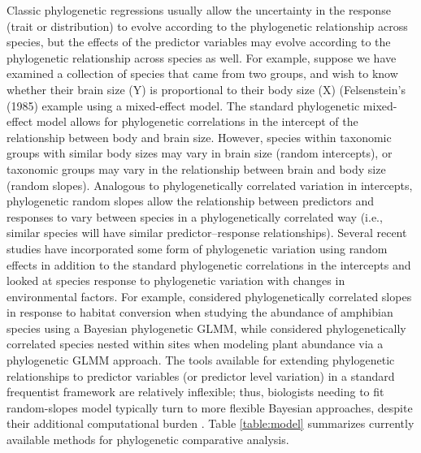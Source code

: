 \documentclass[12pt]{article}
\begin{document}
Classic phylogenetic regressions usually allow the uncertainty in the response (trait or distribution) to evolve according to the phylogenetic relationship across species, but the effects of the predictor variables may evolve according to the phylogenetic relationship across species as well. 
For example, suppose we have examined a collection of species that came from two groups, and wish to know whether their brain size (Y) is proportional to their body size (X) (Felsenstein's (1985) example using a mixed-effect model. 
The standard phylogenetic mixed-effect model allows for phylogenetic correlations in the intercept of the relationship between body and brain size. 
However, species within taxonomic groups with similar body sizes may vary in brain size (random intercepts), or taxonomic groups may vary in the relationship between brain and body size (random slopes). 
Analogous to phylogenetically correlated variation in intercepts, phylogenetic random slopes allow the relationship between predictors and responses to vary between species in a phylogenetically correlated way (i.e., similar species will have similar predictor--response relationships).
Several recent studies have incorporated some form of phylogenetic variation using random effects in addition to the standard phylogenetic correlations in the intercepts and looked at species response to phylogenetic variation with changes in environmental factors.
For example, \cite{nowakowski2018phylogenetic} considered phylogenetically correlated slopes in response to habitat conversion when studying the abundance of amphibian species using a Bayesian phylogenetic GLMM, while \cite{li2017canfun} considered phylogenetically correlated species nested within sites when modeling plant abundance via a phylogenetic GLMM approach. 
The tools available for extending phylogenetic relationships to predictor variables (or predictor level variation) in a standard frequentist framework are relatively inflexible; thus, biologists needing to fit random-slopes model typically turn to more flexible Bayesian approaches, despite their additional computational burden \citep{hadfield2010mcmc, burkner2018brms}.
Table \ref{table:model} summarizes currently available methods for phylogenetic comparative analysis.
\end{document}
